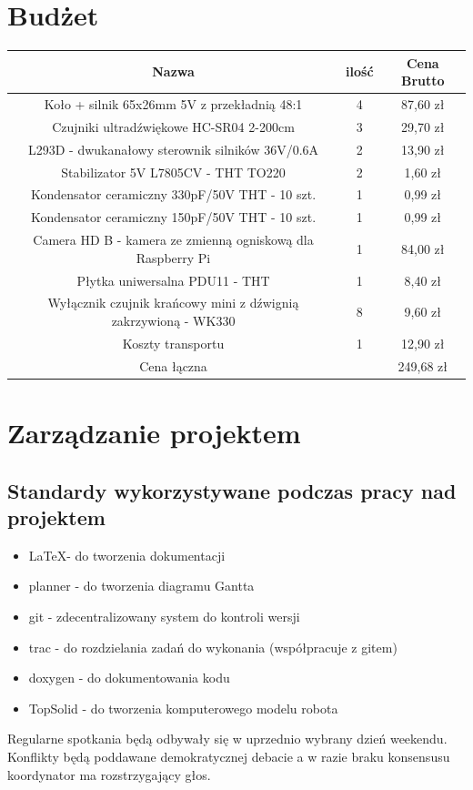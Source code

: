 \documentclass[a4paper]{article}
\begin{document}
\section{Budżet}
   \begin{center}
    \begin{tabular}{|c|c|c|}
        \hline
         Nazwa  & ilość & Cena Brutto \\
        \hline
         Koło + silnik 65x26mm 5V z przekładnią 48:1 & 4 & 87,60 zł \\
        \hline
        Czujniki ultradźwiękowe HC-SR04 2-200cm & 3 & 29,70 zł\\
        \hline
        L293D - dwukanałowy sterownik silników 36V/0.6A & 2 & 13,90 zł\\
        \hline
        Stabilizator 5V L7805CV - THT TO220 & 2 & 1,60 zł\\
        \hline
        Kondensator ceramiczny 330pF/50V THT - 10 szt. & 1 & 0,99 zł\\
        \hline
        Kondensator ceramiczny 150pF/50V THT - 10 szt. & 1 & 0,99 zł\\
        \hline
        Camera HD B - kamera ze zmienną ogniskową dla Raspberry Pi & 1 & 84,00 zł\\
        \hline
        Płytka uniwersalna PDU11 - THT & 1 & 8,40 zł\\
        \hline
        Wyłącznik czujnik krańcowy mini z dźwignią zakrzywioną - WK330 & 8 & 9,60 zł\\
        \hline
        Koszty transportu & 1 & 12,90 zł\\
        \hline
        Cena łączna & & 249,68 zł\\
        \hline
    \end{tabular}
    \end{center}
\section{Zarządzanie projektem}
    \subsection{Standardy wykorzystywane podczas pracy nad projektem}
    \begin{itemize}
        \item \LaTeX - do tworzenia dokumentacji
        \item planner - do tworzenia diagramu Gantta
        \item git - zdecentralizowany system do kontroli wersji
        \item trac - do rozdzielania zadań do wykonania (współpracuje z gitem)
        \item doxygen - do dokumentowania kodu
        \item TopSolid - do tworzenia komputerowego modelu robota
    \end{itemize}
    Regularne spotkania będą odbywały się w uprzednio wybrany dzień weekendu. Konflikty będą poddawane demokratycznej debacie a w razie braku konsensusu koordynator ma rozstrzygający głos.
\end{document}
